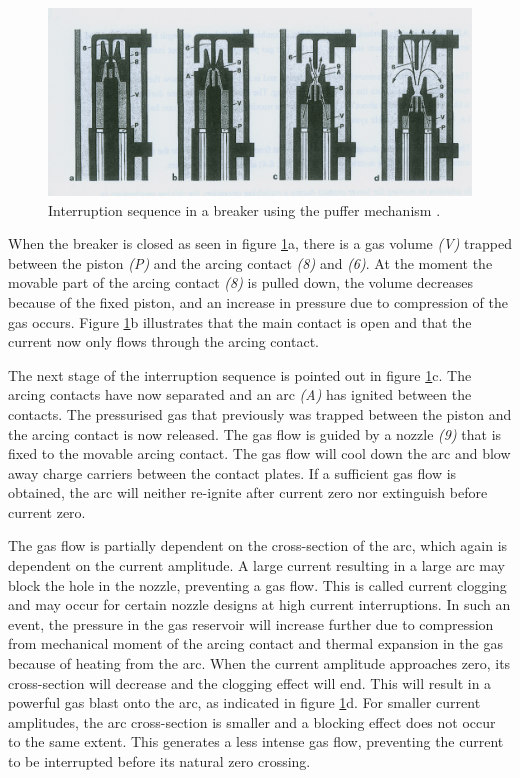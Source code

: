 \documentclass[10pt,a4paper,twoside]{article}
\begin{document}
\begin{figure} [H]
\centering
\includegraphics[scale=0.8]{Bilder/Theory/CircutBreakPuff1.png}
\caption{Interruption sequence in a breaker using the puffer mechanism \cite{bib:HVEbreak}.} \label{fig:CircutBreakPuff1}
\end{figure}

When the breaker is closed as seen in figure \ref{fig:CircutBreakPuff1}a, there is a gas volume \textit{(V)} trapped between the piston \textit{(P)} and the arcing contact \textit{(8)} and \textit{(6)}. At the moment the movable part of the arcing contact \textit{(8)} is pulled down, the volume decreases because of the fixed piston, and an increase in pressure due to compression of the gas occurs. Figure \ref{fig:CircutBreakPuff1}b illustrates that the main contact is open and that the current now only flows through the arcing contact.

The next stage of the interruption sequence is pointed out in figure \ref{fig:CircutBreakPuff1}c. The arcing contacts have now separated and an arc \textit{(A)} has ignited between the contacts. The pressurised gas that previously was trapped between the piston and the arcing contact is now released. The gas flow is guided by a nozzle \textit{(9)} that is fixed to the movable arcing contact. The gas flow will cool down the arc and blow away charge carriers between the contact plates. If a sufficient gas flow is obtained, the arc will neither re-ignite after current zero nor extinguish before current zero.

The gas flow is partially dependent on the cross-section of the arc, which again is dependent on the current amplitude. A large current resulting in a large arc may block the hole in the nozzle, preventing a gas flow. This is called current clogging and may occur for certain nozzle designs at high current interruptions. In such an event, the pressure in the gas reservoir will increase further due to compression from mechanical moment of the arcing contact and thermal expansion in the gas because of heating from the arc. When the current amplitude approaches zero, its cross-section will decrease and the clogging effect will end. This will result in a powerful gas blast onto the arc, as indicated in figure \ref{fig:CircutBreakPuff1}d. For smaller current amplitudes, the arc cross-section is smaller and a blocking effect does not occur to the same extent. This generates a less intense gas flow, preventing the current to be interrupted before its natural zero crossing.
 
\end{document}
